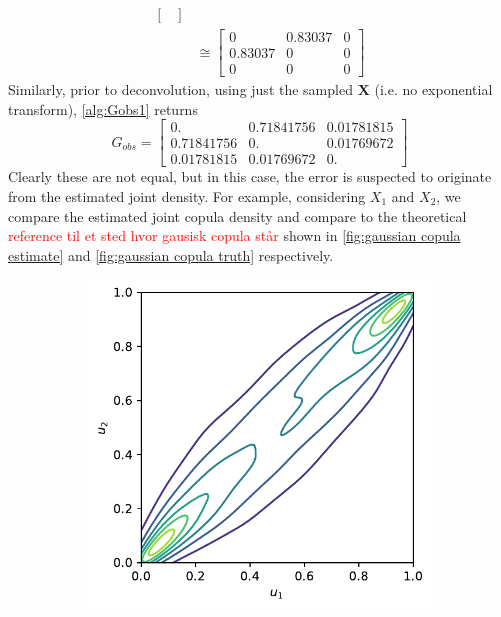 \documentclass[../Thesis.tex]{subfiles}
\begin{document}
\begin{example}
\begin{align*}
\begin{bmatrix}
        \end{bmatrix} \\
                & \cong
        \begin{bmatrix}
            0       & 0.83037 & 0 \\
            0.83037 & 0       & 0 \\
            0       & 0       & 0
        \end{bmatrix}
    \end{align*}
    Similarly, prior to deconvolution, using just the sampled $\boldsymbol X$ (i.e. no exponential transform), \autoref{alg:Gobs1} returns
    $$G_{obs} =
        \begin{bmatrix}
            0.         & 0.71841756 & 0.01781815 \\
            0.71841756 & 0.         & 0.01769672 \\
            0.01781815 & 0.01769672 & 0.
        \end{bmatrix}
    $$
    Clearly these are not equal, but in this case, the error is suspected to originate from the estimated joint density. For example, considering $X_1$ and $X_2$, we compare the estimated joint copula density and compare to the theoretical \textcolor{red}{reference til et sted hvor gausisk copula står} shown in \autoref{fig:gaussian copula estimate} and \autoref{fig:gaussian copula truth} respectively.
    \begin{figure}[H]
        \centering
        \begin{subfigure}[t]{0.45\linewidth}
            \centering
            \includegraphics[width = \linewidth]{figures/ND examples/Gaussian copula sample contour.pdf}

\end{subfigure}
\end{figure}
\end{example}
\end{document}
